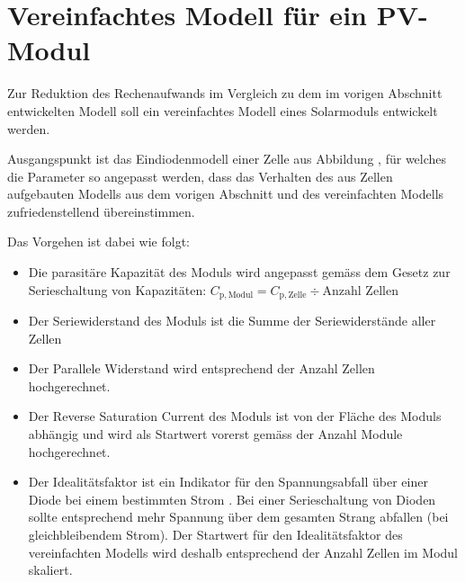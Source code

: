 \chapter{Vereinfachtes Modell f\"ur ein PV-Modul}
\label{app:models:develop:module:simple}

Zur  Reduktion des  Rechenaufwands im  Vergleich zu  dem im  vorigen Abschnitt
entwickelten Modell soll ein vereinfachtes Modell eines Solarmoduls entwickelt
werden.

Ausgangspunkt   ist   das   Eindiodenmodell    einer   Zelle   aus   Abbildung
, f\"ur  welches die Parameter  so angepasst werden,  dass das
Verhalten des aus Zellen aufgebauten Modells aus dem vorigen Abschnitt und des
vereinfachten Modells zufriedenstellend \"ubereinstimmen.

Das Vorgehen ist dabei wie folgt: 

\begin{itemize}
    \item
        Die parasit\"are  Kapazit\"at des  Moduls wird angepasst  gem\"ass dem
        Gesetz zur Serieschaltung von Kapazit\"aten:
        $C_{\mathrm{p, Modul}} = C_{\mathrm{p, Zelle}} \div \text{Anzahl Zellen}$
    \item
        Der Seriewiderstand des Moduls ist die Summe der Seriewiderst\"ande aller
        Zellen
    \item
        Der  Parallele   Widerstand  wird   entsprechend  der   Anzahl  Zellen
        hochgerechnet.
    \item
        Der Reverse  Saturation Current  des Moduls ist  von der  Fl\"ache des
        Moduls abh\"angig und  wird als Startwert vorerst  gem\"ass der Anzahl
        Module hochgerechnet.
    \item
        Der  Idealit\"atsfaktor ist  ein Indikator  f\"ur den  Spannungsabfall
        \"uber   einer   Diode   bei   einem   bestimmten   Strom   . Bei  einer Serieschaltung  von Dioden  sollte entsprechend
        mehr   Spannung    \"uber   dem   gesamten   Strang    abfallen   (bei
        gleichbleibendem  Strom). Der Startwert  f\"ur den  Idealit\"atsfaktor
        des vereinfachten Modells wird  deshalb entsprechend der Anzahl Zellen
        im Modul skaliert.
\end{itemize}

